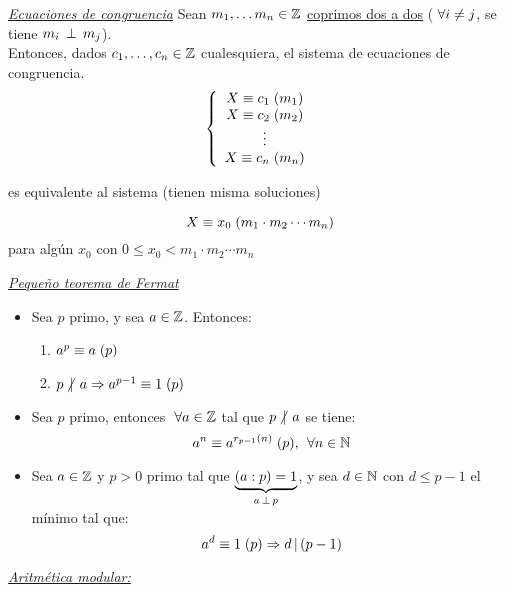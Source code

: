 \textit\underline{Ecuaciones de congruencia}
Sean $m_1,\dots m_n \en \enteros$ \underline{coprimos dos a dos} ($\paratodo i \distinto j$, se tiene $m_i \cop m_j$). \\
Entonces, dados $c_1,\dots, c_n \en \enteros$ cualesquiera, el sistema de ecuaciones de congruencia.
\[
	\llave{c}{
		\congruencia{X}{c_1}{m_1}\\
		\congruencia{X}{c_2}{m_2}\\
		\vdots\\
		\congruencia{X}{c_n}{m_n}
	}
\]

es equivalente al sistema (tienen misma soluciones)

\[
	\congruencia{X}{x_0}{m_1\cdot m_2 \cdots m_n}
\]
para algún $x_0$ con $0\leq x_0 < m_1\cdot m_2 \cdots m_n$

\textit{\underline{Pequeño teorema de Fermat}}
\begin{itemize}
	\item Sea $p$ primo, y sea $a \en \enteros$. Entonces:
	      \begin{enumerate}[label=\arabic*.)]
		      \item $ \congruencia{a^p}{a}{p} $
		      \item $ p \noDivide a \entonces \congruencia{a^{p-1}}{1}{p} $
	      \end{enumerate}
	\item Sea $p$ primo, entonces $ \paratodo a \en \enteros$ tal que $ p \noDivide a$ se tiene:
	      \[
		      \congruencia{a^n}{a^{r_{p-1}(n)}}{p} ,\, \paratodo n \en \naturales
	      \]
	\item Sea $a \en \enteros$ y $p > 0$ primo tal que $\ub{(a:p) = 1}{a \cop p}$, y sea  $d \en \naturales$ con $d \leq p-1$
	      el mínimo tal que:
	      \[
		      \congruencia{a^d}{1}{p} \entonces d \divideA (p-1)
	      \]
\end{itemize}


\textit{\underline{Aritmética modular:}}

\newcommand{\moduloN}[1]{\enteros/_{#1\enteros}}

